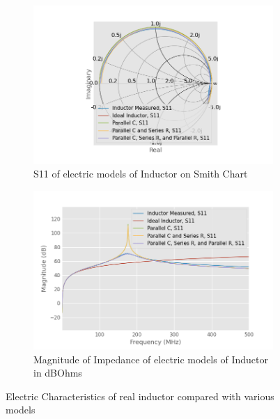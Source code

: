 \documentclass{article}
\begin{document}
\begin{figure}
    \centering
    \begin{subfigure}{\linewidth}
        \centering
        \includegraphics[width=\linewidth]{./pics/inductor_models_smith.png}
        \caption{S11 of electric models of Inductor on Smith Chart}
        \label{fig:inductor_compare_s}
    \end{subfigure}

    \begin{subfigure}{\linewidth}
        \centering
        \includegraphics[width=\linewidth]{./pics/inductor_models_db.png}
        \caption{Magnitude of Impedance of electric models of Inductor in dBOhms}
        \label{fig:inductor_compare_z}
    \end{subfigure}
    \caption{Electric Characteristics of real inductor compared with various models}
    \label{fig:inductor_compare}
\end{figure}
\end{document}
